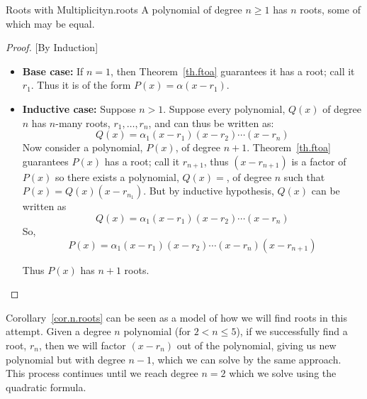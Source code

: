 \begin{corollary}{Roots with Multiplicity}{n.roots}
  A polynomial of degree $n\ge 1$ has $n$ roots, some of which may be equal.
\end{corollary}
\begin{proof}

  [By Induction]
  
  \begin{itemize}
    
  \item \textbf{Base case:} If $n=1$, then Theorem~\ref{th.ftoa}
    guarantees it has a root; call it $r_1$.  Thus it is of the form
    $P(x)=\alpha (x-r_1)$.
  \item \textbf{Inductive case:} Suppose $n>1$.  Suppose every polynomial, $Q(x)$ of degree
    $n$ has $n$-many roots, $r_1,\ldots,r_n$, and can thus be written as:
    \[Q(x) = \alpha_1 (x - r_1) (x - r_2) \cdots (x - r_n)\]
    Now consider a polynomial, $P(x)$, of
    degree $n+1$.  Theorem~\ref{th.ftoa} guarantees $P(x)$ has a root;
    call it $r_{n+1}$, thus $(x-r_{n+1})$ is a factor of $P(x)$ so there
    exists a polynomial, $Q(x)=$, of degree $n$ such that
    $P(x) =  Q(x) (x-r_{n_1})$.
    But by inductive hypothesis, $Q(x)$ can be written
    as \[Q(x) = \alpha_1 (x - r_1) (x - r_2) \cdots (x - r_n)\]
    So, \[P(x) = \alpha_1 (x - r_1) (x - r_2) \cdots (x - r_n) (x-r_{n+1})\]

    Thus $P(x)$ has $n+1$ roots.
  \end{itemize}
\end{proof}

Corollary~\ref{cor.n.roots} can be seen as a model of how we will find
roots in this attempt.  Given a degree $n$ polynomial (for $2<n\leq
5$), if we successfully find a root, $r_n$, then we will factor
$(x-r_n)$ out of the polynomial, giving us new polynomial but with
degree $n-1$, which we can solve by the same approach.  This process
continues until we reach degree $n=2$ which we solve using the
quadratic formula.
